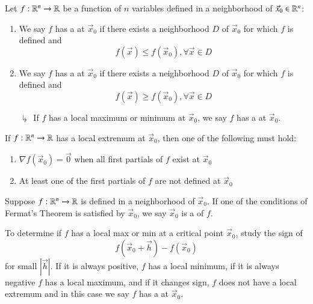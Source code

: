 \documentclass[12pt, a4paper, oneside, openright, titlepage]{book}
\begin{document}
\begin{appendices}
    \begin{defn}
        Let $f:\mathbb R^n\rightarrow \mathbb R$ be a function of $n$ variables defined in a neighborhood of $\vec{x}_0 \in \mathbb R^n$: \begin{enumerate}
            \item We say $f$ has a  at $\vec{x}_0$ if there exists a neighborhood $D$ of $\vec{x}_0$ for which $f$ is defined and \begin{equation}
                f(\vec{x}) \leq f(\vec{x}_0), \forall \vec{x} \in D
            \end{equation}
            \item We say $f$ has a  at $\vec{x}_0$ if there exists a neighborhood $D$ of $\vec{x}_0$ for which $f$ is defined and \begin{equation}
                f(\vec{x}) \geq f(\vec{x}_0), \forall \vec{x} \in D
            \end{equation}
            \item[$\drsh$] If $f$ has a local maximum or minimum at $\vec{x}_0$, we say $f$ has a  at $\vec{x}_0$.
        \end{enumerate}
    \end{defn}
    
    \begin{thm}[Fermat]
        If $f:\mathbb R^n\rightarrow \mathbb R$ has a local extremum at $\vec{x}_0$, then one of the following must hold:\begin{enumerate}
            \item $\nabla f(\vec{x}_0) = \vec{0}$ when all first partials of $f$ exist at $\vec{x}_0$
            \item At least one of the first partials of $f$ are not defined at $\vec{x}_0$
        \end{enumerate}
    \end{thm}
    
    \begin{defn}
        Suppose $f:\mathbb R^n\rightarrow \mathbb R$ is defined in a neighborhood of $\vec{x}_0$. If one of the conditions of Fermat's Theorem is satisfied by $\vec{x}_0$, we say $\vec{x}_0$ is a  of $f$.
    \end{defn}
    
    \begin{rmk}
        To determine if $f$ has a local max or min at a critical point $\vec{x}_0$, study the sign of \begin{equation}
            f(\vec{x}_0 + \vec{h}) - f(\vec{x}_0)
        \end{equation}
        for small $|\vec{h}|$. If it is always positive, $f$ has a local minimum, if it is always negative $f$ has a local maximum, and if it changes sign, $f$ does not have a local extremum and in this case we say $f$ has a  at $\vec{x}_0$.
    \end{rmk}
    

\end{appendices}
\end{document}

